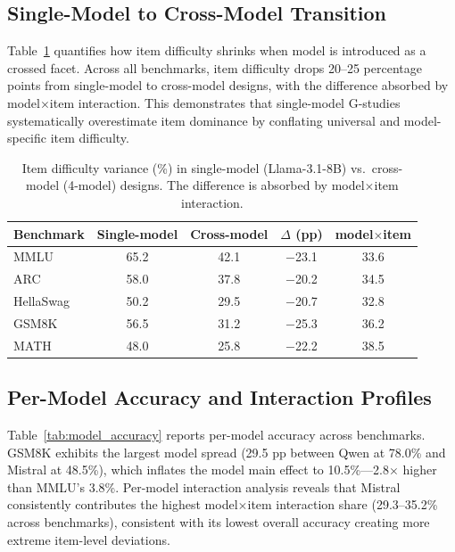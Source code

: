 \documentclass[11pt]{article}
\begin{document}
\subsection{Single-Model to Cross-Model Transition}

Table~\ref{tab:single_cross} quantifies how item difficulty shrinks when model is introduced as a crossed facet.
Across all benchmarks, item difficulty drops 20--25 percentage points from single-model to cross-model designs, with the difference absorbed by model$\times$item interaction.
This demonstrates that single-model G-studies systematically overestimate item dominance by conflating universal and model-specific item difficulty.

\begin{table}[t]
\centering
\caption{Item difficulty variance (\%) in single-model (Llama-3.1-8B) vs.\ cross-model (4-model) designs. The difference is absorbed by model$\times$item interaction.}
\label{tab:single_cross}
\small
\begin{tabular}{@{}lcccc@{}}
\toprule
Benchmark & Single-model & Cross-model & $\Delta$ (pp) & model$\times$item \\
\midrule
MMLU      & 65.2 & 42.1 & $-$23.1 & 33.6 \\
ARC       & 58.0 & 37.8 & $-$20.2 & 34.5 \\
HellaSwag & 50.2 & 29.5 & $-$20.7 & 32.8 \\
GSM8K     & 56.5 & 31.2 & $-$25.3 & 36.2 \\
MATH      & 48.0 & 25.8 & $-$22.2 & 38.5 \\
\bottomrule
\end{tabular}
\end{table}

\subsection{Per-Model Accuracy and Interaction Profiles}

Table~\ref{tab:model_accuracy} reports per-model accuracy across benchmarks.
GSM8K exhibits the largest model spread (29.5 pp between Qwen at 78.0\% and Mistral at 48.5\%), which inflates the model main effect to 10.5\%---2.8$\times$ higher than MMLU's 3.8\%.
Per-model interaction analysis reveals that Mistral consistently contributes the highest model$\times$item interaction share (29.3--35.2\% across benchmarks), consistent with its lowest overall accuracy creating more extreme item-level deviations.
\end{document}
